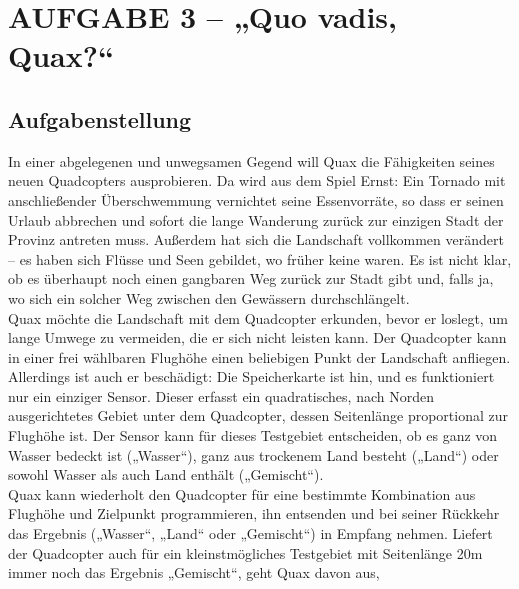 \documentclass[a4paper,12pt]{article}
\begin{document}

\newpage
\section{AUFGABE 3 – „Quo vadis, Quax?“}



\subsection{Aufgabenstellung}
In einer abgelegenen und unwegsamen Gegend will Quax die Fähigkeiten seines neuen Quadcopters
ausprobieren. Da wird aus dem Spiel Ernst: Ein Tornado mit anschließender Überschwemmung
vernichtet seine Essenvorräte, so dass er seinen Urlaub abbrechen und sofort die
lange Wanderung zurück zur einzigen Stadt der Provinz antreten muss. Außerdem hat sich die
Landschaft vollkommen verändert – es haben sich Flüsse und Seen gebildet, wo früher keine
waren. Es ist nicht klar, ob es überhaupt noch einen gangbaren Weg zurück zur Stadt gibt und,
falls ja, wo sich ein solcher Weg zwischen den Gewässern durchschlängelt.
\\[0.4cm]
Quax möchte die Landschaft mit dem Quadcopter erkunden, bevor er loslegt, um lange Umwege
zu vermeiden, die er sich nicht leisten kann. Der Quadcopter kann in einer frei wählbaren
Flughöhe einen beliebigen Punkt der Landschaft anfliegen. Allerdings ist auch er beschädigt:
Die Speicherkarte ist hin, und es funktioniert nur ein einziger Sensor. Dieser erfasst ein quadratisches,
nach Norden ausgerichtetes Gebiet unter dem Quadcopter, dessen Seitenlänge proportional
zur Flughöhe ist. Der Sensor kann für dieses Testgebiet entscheiden, ob es ganz von
Wasser bedeckt ist („Wasser“), ganz aus trockenem Land besteht („Land“) oder sowohl Wasser
als auch Land enthält („Gemischt“).
\\[0.4cm]
Quax kann wiederholt den Quadcopter für eine bestimmte Kombination aus Flughöhe und Zielpunkt
programmieren, ihn entsenden und bei seiner Rückkehr das Ergebnis („Wasser“, „Land“
oder „Gemischt“) in Empfang nehmen. Liefert der Quadcopter auch für ein kleinstmögliches
Testgebiet mit Seitenlänge 20m immer noch das Ergebnis „Gemischt“, geht Quax davon aus,
\end{document}
